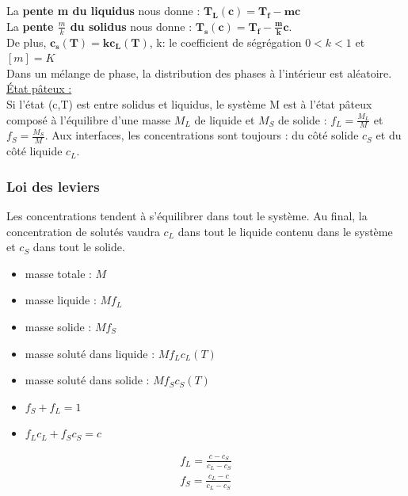 \documentclass[../main.tex]{subfiles}
\begin{document}
La \textbf{pente m du liquidus} nous donne : $\mathbf{T_L(c) = T_f-mc}$\\
La \textbf{pente $\frac{m}{k}$ du solidus} nous donne : $\mathbf{T_s(c) = T_f - \frac{m}{k}c}$.\\
De plus, $\mathbf{c_s(T) = k c_L(T)}$, k: le coefficient de ségrégation $0<k<1$ et $[m]=K$\\

Dans un mélange de phase, la distribution des phases à l'intérieur est aléatoire.\\

\quad \underline{État pâteux :}\\
Si l'état (c,T) est entre solidus et liquidus, le système M est à l'état pâteux composé à l'équilibre d'une masse $M_L$ de liquide et $M_S$ de solide : $f_L = \frac{M_L}{M}$ et $f_S = \frac{M_S}{M}$. Aux interfaces, les concentrations sont toujours : du côté solide $c_S$ et du côté liquide $c_L$.\\

\subsubsection{Loi des leviers}
Les concentrations tendent à s'équilibrer dans tout le système. Au final, la concentration de solutés vaudra $c_L$ dans tout le liquide contenu dans le système et $c_S$ dans tout le solide.\\

\begin{minipage}{.5\textwidth}
\begin{itemize}
    \item masse totale : $M$\\
    \item masse liquide : $M f_L$\\
    \item masse solide : $M f_S$\\
    \item masse soluté dans liquide : $M f_L c_L(T)$\\
    \item masse soluté dans solide : $M f_S c_S(T)$\\
\end{itemize}
\end{minipage}
\begin{minipage}{.5\textwidth}
\begin{itemize}
    \item $f_S + f_L = 1$\\
    \item $f_L c_L + f_S c_S = c$\\
\end{itemize}
\end{minipage}
\begin{equation}
\begin{split}
    f_L = \frac{c - c_S}{c_L-c_S}\\
    f_S = \frac{c_L-c}{c_L-c_S}\\
\end{split}
\end{equation}
\end{document}
